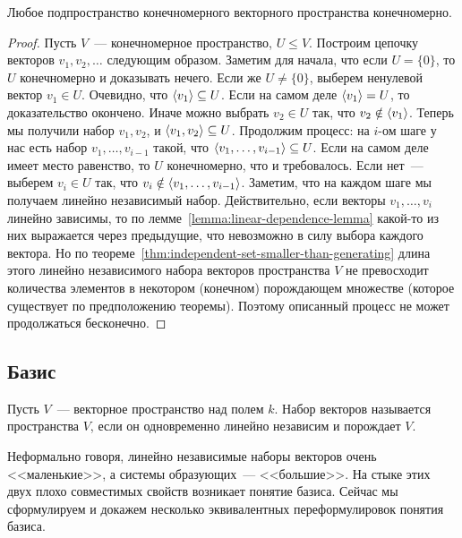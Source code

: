 \begin{proposition}\label{prop:subspace-of-fin-dim-is-fin-dim}
Любое подпространство конечномерного векторного пространства конечномерно.
\end{proposition}
\begin{proof}
Пусть $V$~--- конечномерное пространство, $U\leq V$. Построим цепочку
векторов $v_1,v_2,\dots$ следующим образом.
Заметим для начала, что если $U = \{0\}$, то $U$ конечномерно и доказывать
нечего. Если же $U\neq \{0\}$, выберем ненулевой вектор $v_1\in U$.
Очевидно, что $\langle v_1\rangle\subseteq U$.
Если на самом деле $\langle v_1\rangle = U$, то доказательство окончено. Иначе
можно выбрать $v_2\in U$ так, что $v_2\notin\langle v_1\rangle$.
Теперь мы получили набор $v_1,v_2$, и $\langle v_1,v_2\rangle\subseteq U$.
Продолжим процесс: на $i$-ом шаге у нас есть набор $v_1,\dots,v_{i-1}$ такой,
что $\langle v_1,\dots,v_{i-1}\rangle\subseteq U$. Если на самом деле имеет место равенство,
то $U$ конечномерно, что и требовалось. Если нет~--- выберем
$v_i\in U$ так, что $v_i\notin\langle v_1,\dots,v_{i-1}\rangle$. Заметим, что
на каждом шаге мы получаем линейно независимый набор. Действительно,
если векторы $v_1,\dots,v_i$ линейно зависимы, то по лемме~\ref{lemma:linear-dependence-lemma}
какой-то из них выражается через предыдущие, что невозможно в силу выбора
каждого вектора.
Но по теореме~\ref{thm:independent-set-smaller-than-generating} длина
этого линейно независимого набора векторов пространства $V$ не превосходит
количества элементов в некотором (конечном) порождающем множестве (которое
существует по предположению теоремы). Поэтому описанный процесс не может
продолжаться бесконечно.
\end{proof}

\subsection{Базис}

\begin{definition}
Пусть $V$~--- векторное пространство над полем $k$.
Набор векторов называется  пространства $V$,
если он одновременно линейно независим и порождает $V$.
\end{definition}

Неформально говоря, линейно независимые наборы векторов очень
<<маленькие>>, а системы образующих~--- <<большие>>. На стыке этих
двух плохо совместимых свойств возникает понятие базиса. Сейчас мы
сформулируем и докажем несколько эквивалентных переформулировок
понятия базиса.

